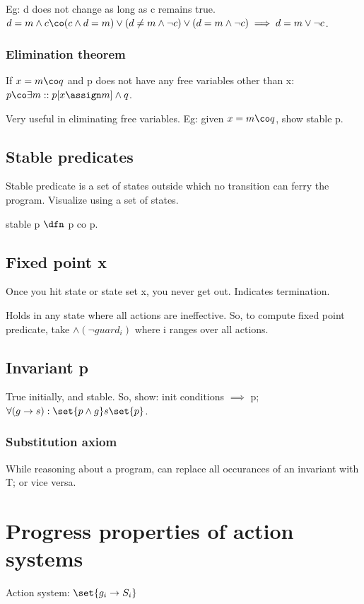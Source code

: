 \documentclass[oneside, article]{memoir}
\begin{document}
Eg: d does not change as long as c remains true. $d = m \land c \co (c \land d = m) \lor (d \neq m \land \lnot c)\lor (d = m \land \lnot c) \implies d = m \lor \lnot c$.

\subsubsection{Elimination theorem}
If $x = m \co q$ and p does not have any free variables other than x: $p \co \exists m:: p[x \assign m] \land q$.

Very useful in eliminating free variables. Eg: given $x = m \co q$, show stable p.



\subsection{Stable predicates}
Stable predicate is a set of states outside which no transition can ferry the program. Visualize using a set of states.

stable p $\dfn$ p co p.

\subsection{Fixed point x}
Once you hit state or state set x, you never get out. Indicates termination.

Holds in any state where all actions are ineffective. So, to compute fixed point predicate, take $\land (\lnot guard_i)$ where i ranges over all actions.

\subsection{Invariant p}
True initially, and stable. So, show: init conditions $\implies$ p; $\forall (g \to s) : \set{p \land g} s \set{p}$.

\subsubsection{Substitution axiom}
While reasoning about a program, can replace all occurances of an invariant with T; or vice versa.


\section{Progress properties of action systems}
Action system: $\set{g_i \to S_i}$
\end{document}

